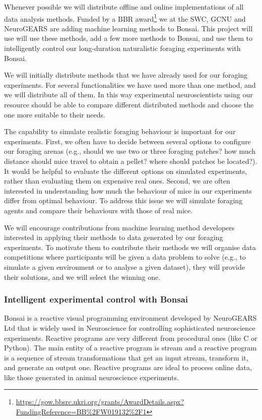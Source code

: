 Whenever possible we will distribute offline and online implementations of all
data analysis methods.
%
Funded by a BBR
award\footnote{\url{https://gow.bbsrc.ukri.org/grants/AwardDetails.aspx?FundingReference=BB\%2FW019132\%2F1}}
we at the SWC, GCNU and NeuroGEARS are adding machine learning methods to
Bonsai. This project will use will use these methods, add a few more methods to
Bonsai, and use them to intelligently control our long-duration naturalistic
foraging experiments with Bonsai.

We will initially distribute methods that we have already used for our foraging
experiments. For several functionalities we have used more than one method, and
we will distribute all of them. In this way experimental neuroscientists using
our resource should be able to compare different distributed methods and choose
the one more suitable to their needs.

The capability to simulate realistic foraging behaviour is important for our
experiments. First, we often have to decide between several options to
configure our foraging arenas (e.g., should we use two or three foraging
patches? how much distance should mice travel to obtain a pellet? where should
patches be located?). It would be helpful to evaluate the different options on
simulated experiments, rather than evaluating them on expensive real
ones. Second, we are often interested in understanding how much the
behaviour of mice in our experiments differ from optimal behaviour. To address
this issue we will simulate foraging agents and
compare their behaviours with those of real mice.

We will encourage contributions from machine learning method developers
interested in applying their methods to data generated by our foraging
experiments. To motivate them to contribute their methods we will organise data
competitions where participants will be given a data problem to solve (e.g., to
simulate a given environment or to analyse a given dataset), they will provide
their solutions, and we will select the winning one.

\subsubsection*{Intelligent experimental control with Bonsai}

Bonsai is a reactive visual programming environment developed by NeuroGEARS Ltd
that is widely used in Neuroscience for controlling sophisticated neuroscience
experiments. Reactive programs are very different from procedural ones (like C
or Python). The main entity of a reactive program is stream and a reactive
program is a sequence of stream transformations that get an input stream,
transform it, and generate an output one. Reactive programs are ideal to
process online data, like those generated in animal neuroscience experiments.

